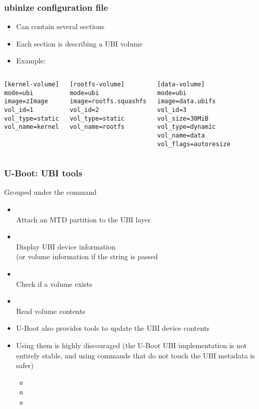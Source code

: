 \begin{frame}[fragile]
  \frametitle{ubinize configuration file}
  \begin{itemize}
  \item Can contain several sections
  \item Each section is describing a UBI volume
  \item Example:
  \end{itemize}
  \begin{columns}
\small
\begin{verbatim}
[kernel-volume]
mode=ubi
image=zImage
vol_id=1
vol_type=static
vol_name=kernel
\end{verbatim}
\small
\begin{verbatim}
[rootfs-volume]
mode=ubi
image=rootfs.squashfs
vol_id=2
vol_type=static
vol_name=rootfs
\end{verbatim}
\small
\begin{verbatim}
[data-volume]
mode=ubi
image=data.ubifs
vol_id=3
vol_size=30MiB
vol_type=dynamic
vol_name=data
vol_flags=autoresize
\end{verbatim}
  \end{columns}
\end{frame}

\begin{frame}
  \frametitle{U-Boot: UBI tools}
  Grouped under the  command
    \begin{itemize}
    \item {}\\
	Attach an MTD partition to the UBI layer
    \item {}\\
	Display UBI device information\\
	(or volume information if the  string is passed
    \item {}\\
	Check if a volume exists
    \item {}\\
	Read volume contents
    \item U-Boot also provides tools to update the UBI device contents
    \item Using them is highly discouraged (the U-Boot UBI implementation
      is not entirely stable, and using commands that do not touch the UBI
      metadata is safer)
      \begin{itemize}
      \item {}
      \item {}
      \item {}
      \end{itemize}
    \end{itemize}
\end{frame}

